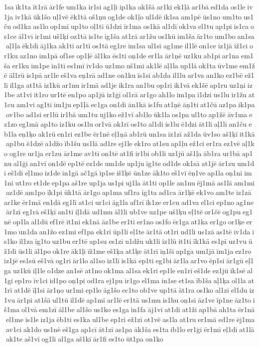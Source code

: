 1sa īk1ta īt1rā ār1fe um1ka ir1si ag1ļi ip1ka ak1šā ar1ki ek1ļā ar1bā ed1da os1le iv1ja iv1kā ūk1šo uļ1vē ēk1tā oš1ņu og1de ok1ļo ul1dē ik1sa am1pē ūs1no um1to us1ču od1ka as1lo op1mī up1to oļ1ti ū1dzi īr1ma os1kā al1dī ok1va el1tu ap1pi is1ca os1ce āl1vi ir1mi uš1ķi oz1tā is1te ig1ša at1rā ar1žu os1kū im1ša ār1to um1bo an1sa aļ1ļa ēk1di āj1ka ak1tī ar1tī os1tā eg1re im1sa ul1sī ag1me il1lē on1ce iz1jā iž1ci or1ku az1no im1pā of1se op1ļē āl1ka ēs1ti oņ1de er1la ār1ņē uz1ku ab1pi ar1na em1ša er1ku im1pe in1tī es1mī īv1do uz1mo uš1mi ak1lē aļ1la up1lā ok1ta ūv1me em1žē āl1rū is1pā ar1le eš1va eņ1rā ad1ne on1ku īs1si ab1da il1lu ar1va an1ko ez1bē ež1li il1ga at1tā iz1kū ar1nu ir1mā ad1je ik1ra an1bu op1ri ik1vā ek1šē ap1ru uz1ņi iz1be at1vi it1ro ur1tē en1po ap1jū iz1ģī ol1rā ar1go ah1lo im1pa ī1dzi us1lu ir1žu at1cu am1vi ag1ti im1ju ep1ļā ec1ga on1di ān1kā is1fu at1ņē āņ1ti at1čū az1pa ik1pa ov1bo ad1si er1lū ir1bā um1tu uj1ko ež1vī ab1lo ūk1la os1pa ul1to ap1žē āv1ma ez1zo eg1mā ap1to iz1ku os1lu or1vā ok1rī os1to al1di is1lu ē1dzi āt1li aļ1li an1ču eb1la eņ1ķo ak1rū en1ri ez1be ēr1nē eļ1ņā ab1rū un1sa iz1zī až1da ūv1so aš1ķī it1kā ap1bu ē1dzē a1džo īb1šu us1lā ad1re ej1le ek1ro at1su ap1ļu ež1ci er1ra ez1vē aļ1ko og1re ur1ja er1zu ār1me av1tī on1tē at1fi ir1bi ob1li uz1jū aš1ļa āb1ra ur1bā ap1nu al1ģi an1vī on1dē ep1tē ez1de um1de up1ju īg1te od1de ok1sā at1jē ār1zu um1di eš1di eļ1mo iz1de in1gā ač1gā ip1se iš1ķē ūn1ze āk1to eš1vī ēņ1ve ap1la oņ1ni im1ni ut1ro et1de ep1pa aš1re up1ja us1pi uj1la āt1ti op1le an1nu ēj1mā as1lā am1mi az1dē am1po īk1pi ūk1tā ār1go ap1ma uf1ra īg1ta ad1ca ār1ķē ek1vo am1te iz1zā ar1ke ēr1mā en1dā eg1lī at1ci ur1ci āg1la af1ri īk1ze er1cu ad1va el1ci ep1no ag1ne ār1zī eg1rā eš1ķī an1ti iļ1dā ud1mu āl1li ub1ve uz1pe uš1ķu eļ1tē or1čē og1pu eg1nē op1la al1dū ef1rē īt1ni ek1nā āz1be er1ti er1no os1fo ēr1ga at1ka er1go or1ķe er1mo un1da an1žo ez1mi ef1pa ek1rī ūp1li eļ1te ār1tā ot1ri ud1li us1zā as1tē iv1da is1ko il1za īg1to uz1bu er1tē ap1su es1zi u1džu uk1li iz1lū it1ti īk1kā es1pī uz1vu ūž1di ūs1li āl1po ok1re āk1ļi īž1me eš1ķa at1ķe āt1rī iņ1ši ap1ga um1jā īm1ja ez1ro iz1jē es1sū eš1vā og1ri ār1lo al1so iz1lī is1kā ep1ti eg1bi ār1la ar1vo ēp1si ār1gū eļ1ga uz1kū iļ1le o1dze an1sē at1no ok1ma al1sa ek1ri ep1le en1rī eš1de ez1jū ik1sē al1gi ep1ro īv1ci id1po oņ1pi od1ra ej1pu ir1go el1ma in1se et1sa īb1ša aļ1ķa ol1la at1rī at1dē īļ1si ār1ņo ur1mi ep1lo āg1šo ec1to ob1ve up1tā āt1ra os1ko al1zi el1du iz1vu ār1pi at1šā ul1tū il1dē ap1mī ar1lē er1tā us1mu is1hu oņ1si āz1ve īp1ne āz1to iš1ma ol1vā em1zī āl1be al1šo us1ko es1ga in1fa āj1vi at1di at1ži ap1bā ah1ta ēr1nā el1me īs1le iz1ja ēb1ti es1ka ul1be ep1ri ež1zī ot1vē as1la at1ru er1mā ed1re ēj1ma av1ci ak1do us1nē eš1ga ap1cī āt1zī as1pa āk1ša es1ta ib1lo er1ģi ēr1mī eļ1di at1lā ak1te aš1vī og1li al1ga aš1kī ār1fi es1to ūt1pa on1ko 